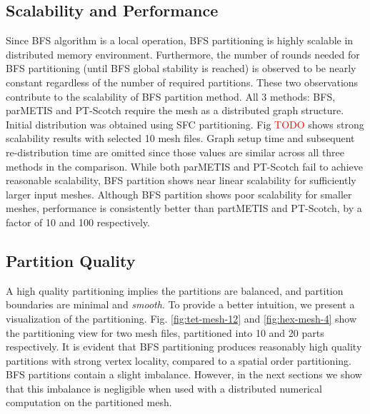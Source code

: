 \documentclass[conference]{IEEEtran}
\begin{document}
\subsection{Scalability and Performance}
Since BFS algorithm is a local operation, BFS partitioning is highly scalable in distributed memory environment. Furthermore, the number of rounds needed for BFS partitioning (until BFS global stability is reached) is observed to be nearly constant regardless of the number of required partitions. These two observations contribute to the scalability of BFS partition method. All 3 methods: BFS, parMETIS and PT-Scotch require the mesh as a distributed graph structure. Initial distribution was obtained using SFC partitioning. Fig \textcolor{red}{TODO} shows strong scalability results with selected 10 mesh files. Graph setup time and subsequent re-distribution time are omitted since those values are similar across all three methods in the comparison. While both parMETIS and PT-Scotch fail to achieve reasonable scalability, BFS partition shows near linear scalability for sufficiently larger input meshes. Although BFS partition shows poor scalability for smaller meshes, performance is consistently better than partMETIS and PT-Scotch, by a factor of 10 and 100 respectively.


\subsection{Partition Quality}



A high quality partitioning implies the partitions are balanced, and partition boundaries are minimal and \emph{smooth}. To provide a better intuition, we present a visualization of the partitioning. Fig. \ref{fig:tet-mesh-12} and \ref{fig:hex-mesh-4} show the partitioning view for two mesh files, partitioned into 10 and 20 parts respectively. It is evident that BFS partitioning produces reasonably high quality partitions with strong vertex locality, compared to a spatial order partitioning. BFS partitions contain a slight imbalance. However, in the next sections we show that this imbalance is negligible when used with a distributed numerical computation on the partitioned mesh.
\end{document}
